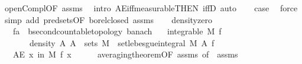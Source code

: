 \begin{isabellebody}
\ open{\isacharunderscore}{\kern0pt}Compl{\isacharbrackleft}{\kern0pt}OF\ assms{\isacharparenleft}{\kern0pt}{}{\isacharparenright}{\kern0pt}{\isacharbrackright}{\kern0pt}\ \isamarkupfalse%
\ {\isacharparenleft}{\kern0pt}intro\ AE{\isacharunderscore}{\kern0pt}iff{\isacharunderscore}{\kern0pt}measurable{\isacharbrackleft}{\kern0pt}THEN\ iffD{}{\isacharbrackright}{\kern0pt}{\isacharcomma}{\kern0pt}\ auto{\isacharparenright}{\kern0pt}\isanewline
\ \ \isamarkupfalse%
\ {\isacharquery}{\kern0pt}case\ \isamarkupfalse%
\ force\isanewline
{}\isamarkupfalse%
\ {\isacharparenleft}{\kern0pt}simp\ add{\isacharcolon}{\kern0pt}\ pred{\isacharunderscore}{\kern0pt}sets{}{\isacharbrackleft}{\kern0pt}OF\ borel{\isacharunderscore}{\kern0pt}closed{\isacharbrackright}{\kern0pt}\ assms{\isacharparenleft}{\kern0pt}{}{\isacharparenright}{\kern0pt}{\isacharparenright}{\kern0pt}%
\endisatagproof
{\isafoldproof}%
%
\isadelimproof
\isanewline
%
\endisadelimproof
\ \ \isanewline
{}\isamarkupfalse%
\ density{\isacharunderscore}{\kern0pt}zero{\isacharcolon}{\kern0pt}\isanewline
\ \ \ f{\isacharcolon}{\kern0pt}{\isacharcolon}{\kern0pt}{\isachardoublequoteopen}{\isacharprime}{\kern0pt}a\ {\isasymRightarrow}\ {\isacharprime}{\kern0pt}b{\isacharcolon}{\kern0pt}{\isacharcolon}{\kern0pt}{\isacharbraceleft}{\kern0pt}second{\isacharunderscore}{\kern0pt}countable{\isacharunderscore}{\kern0pt}topology{\isacharcomma}{\kern0pt}\ banach{\isacharbraceright}{\kern0pt}{\isachardoublequoteclose}\isanewline
\ \ \ {\isachardoublequoteopen}integrable\ M\ f{\isachardoublequoteclose}\isanewline
\ \ \ \ \ \ \ density{\isacharunderscore}{\kern0pt}{}{\isacharcolon}{\kern0pt}\ {\isachardoublequoteopen}{\isasymAnd}A{\isachardot}{\kern0pt}\ A\ {\isasymin}\ sets\ M\ {\isasymLongrightarrow}\ set{\isacharunderscore}{\kern0pt}lebesgue{\isacharunderscore}{\kern0pt}integral\ M\ A\ f\ {\isacharequal}{\kern0pt}\ {}{\isachardoublequoteclose}\isanewline
\ \ \ {\isachardoublequoteopen}AE\ x\ in\ M{\isachardot}{\kern0pt}\ f\ x\ {\isacharequal}{\kern0pt}\ {}{\isachardoublequoteclose}\isanewline
%
\isadelimproof
\ \ %
\endisadelimproof
%
\isatagproof
{}\isamarkupfalse%
\ averaging{\isacharunderscore}{\kern0pt}theorem{\isacharbrackleft}{\kern0pt}OF\ assms{\isacharparenleft}{\kern0pt}{}{\isacharparenright}{\kern0pt}{\isacharcomma}{\kern0pt}\ of\ {\isachardoublequoteopen}{\isacharbraceleft}{\kern0pt}{}{\isacharbraceright}{\kern0pt}{\isachardoublequoteclose}{\isacharbrackright}{\kern0pt}\ assms{\isacharparenleft}{\kern0pt}{}{\isacharparenright}{\kern0pt}\isanewline

\end{isabellebody}
